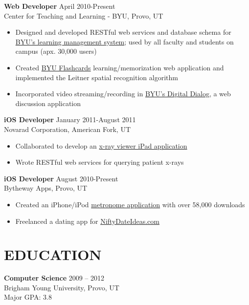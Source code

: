 \documentclass[margin]{res}
\begin{document}
\begin{resume}
      {\bf Web Developer} \hfill April 2010-Present \\
      Center for Teaching and Learning - BYU, Provo, UT
      \begin{itemize} \itemsep -2pt
        \item Designed and developed RESTful web services and database
         schema for \href{http://lsinfo.byu.edu/}{BYU's learning management system};
         used by all faculty and students on campus (apx. 30,000 users)
        \item Created 
        \href{http://ctl.byu.edu/tools/byu-flashcards}{BYU Flashcards}
        learning/memorization web application and implemented the Leitner
        spatial recognition algorithm
        \item Incorporated video streaming/recording in
        \href{http://ctl.byu.edu/tools/byu-digital-dialog}{BYU's Digital Dialog},
        a web discussion application
      \end{itemize}

      {\bf iOS Developer} \hfill January 2011-August 2011 \\
      Novarad Corporation, American Fork, UT
      \begin{itemize} \itemsep -2pt
        \item Collaborated to develop an
        \href{http://ww1.novarad.net/ipad-viewers/}{x-ray viewer iPad application}
        \item Wrote RESTful web services for querying patient x-rays
      \end{itemize}

      {\bf iOS Developer} \hfill  August 2010-Present \\
      Bytheway Apps, Provo, UT
      \begin{itemize} \itemsep -2pt
        \item Created an iPhone/iPod
        \href{http://itunes.apple.com/us/app/backbeat-pro-metronome/id415229485?mt=8}{metronome application}
        with over 58,000 downloads
        \item Freelanced a dating app for
        \href{http://itunes.apple.com/us/app/nifty-date-ideas/id425978808?mt=8}{NiftyDateIdeas.com}
      \end{itemize}

    \section{EDUCATION}
      {\bf Computer Science} \hfill 2009 – 2012 \\
      Brigham Young University, Provo, UT\\
      Major GPA: 3.8


\end{resume}
\end{document}
